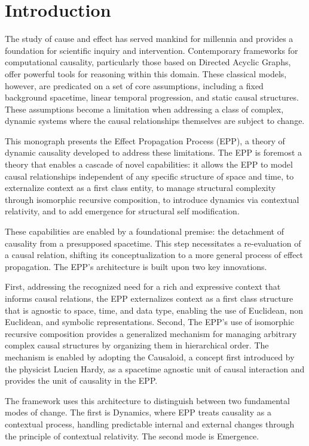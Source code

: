 \section{Introduction}
\label{sec:introduction}

The study of cause and effect has served mankind for millennia and provides a foundation for scientific inquiry and intervention.
Contemporary frameworks for computational causality, particularly those based on Directed Acyclic Graphs, offer powerful tools for reasoning within this domain.
These classical models, however, are predicated on a set of core assumptions, including a fixed background spacetime, linear temporal progression,
and static causal structures.
These assumptions become a limitation when addressing a class of complex, dynamic systems where the causal relationships themselves are subject to change.

This monograph presents the Effect Propagation Process (EPP), a theory of dynamic causality developed to address these limitations.
The EPP is foremost a theory that enables a cascade of novel capabilities: it allows the EPP to model causal relationships independent of any specific structure of space and time,
to externalize context as a first class entity, to manage structural complexity through isomorphic recursive composition,
to introduce dynamics via contextual relativity, and to add emergence for structural self modification.

These capabilities are enabled by a foundational premise: the detachment of causality from a presupposed spacetime. This step necessitates a re-evaluation of a causal relation, shifting its conceptualization to a more general process of effect propagation. The EPP's architecture is built upon two key innovations.

First, addressing the recognized need for a rich and expressive context that informs causal relations, the EPP externalizes context as a first class structure that is agnostic to space, time, and data type, enabling the use of Euclidean, non Euclidean, and symbolic representations.
Second, The EPP's use of isomorphic recursive composition provides a generalized mechanism for managing arbitrary complex causal structures by
organizing them in hierarchical order. The mechanism is enabled by adopting the Causaloid, a concept first introduced by the physicist Lucien Hardy,
as a spacetime agnostic unit of causal interaction and provides the unit of causality in the EPP.

The framework uses this architecture to distinguish between two fundamental modes of change.
The first is Dynamics, where EPP treats causality as a contextual process, handling predictable internal and external changes through the principle of contextual relativity.
The second mode is Emergence.

